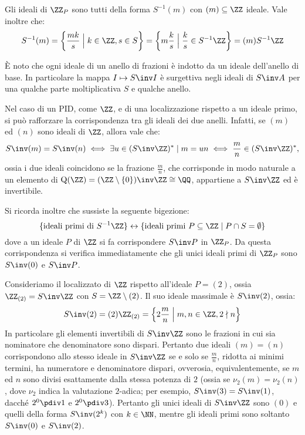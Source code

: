 \documentclass[11pt]{scrartcl}
\begin{document}
	Gli ideali di $\ZZ_P$
	sono tutti della forma $S^{-1}(m)$ con $(m)\subseteq \ZZ$ ideale. Vale inoltre
	che:
	\[
	S^{-1}(m) = \left\{\frac{mk}{s} \Bigm|k \in \ZZ, s \in S\right\} = 
	\left\{m\frac k s\Bigm| \frac k s \in S^{-1}\ZZ\right\} = (m)S^{-1}\ZZ
	\]
	
	È noto che ogni ideale di un anello di frazioni è indotto da un ideale
	dell'anello di base. In particolare la mappa $I \mapsto S\inv I$ è surgettiva
	negli ideali di $S\inv A$ per una qualche parte moltiplicativa $S$ e qualche
	anello. \medskip
	
	Nel
	caso di un PID, come $\ZZ$, e di una localizzazione rispetto a un ideale primo, si può rafforzare la corrispondenza tra gli ideali dei due anelli. Infatti, se $(m)$ ed $(n)$ sono ideali di $\ZZ$,
	allora vale che:
	\[ S\inv (m) = S\inv (n) \iff \exists u \in (S\inv \ZZ)^* \mid m = un \iff \frac{m}{n} \in (S\inv \ZZ)^*, \]
	ossia i due ideali coincidono se la frazione $\frac{m}{n}$, che corrisponde in modo naturale a un elemento di
	$\operatorname{Q}(\ZZ) = (\ZZ \setminus \{0\})\inv \ZZ \cong \QQ$, appartiene a $S\inv \ZZ$ ed è invertibile. \medskip
	
	Si ricorda inoltre che sussiste la seguente bigezione:
	\[
	\{\text{ideali primi di }S^{-1}\ZZ\} \leftrightarrow 
	\{\text{ideali primi } P\subseteq \ZZ \mid P \cap S = \emptyset\}
	\]
	dove a un ideale $P$ di $\ZZ$ si fa corrispondere $S\inv P$ in
	$\ZZ_P$. Da questa corrispondenza si verifica immediatamente che gli
	unici ideali primi di $\ZZ_P$ sono $S\inv (0)$ e $S\inv P$.
	
	\begin{remark}[Localizzazione rispetto a $P = (2)$]
		Consideriamo il localizzato di $\ZZ$ rispetto all'ideale $P = (2)$, ossia
		$\ZZ_{(2)} = S\inv \ZZ$ con $S = \ZZ \setminus (2)$. Il suo ideale massimale
		è $S\inv (2)$, ossia:
		\[ S\inv (2) = (2) \ZZ_{(2)} = \left\{ 2 \frac{m}{n} \Bigm| m, n \in \ZZ, 2 \nmid n \right\} \]
		In particolare gli elementi invertibili di $S\inv \ZZ$ sono le frazioni
		in cui sia nominatore che denominatore sono dispari. Pertanto due ideali
		$(m) = (n)$ corrispondono allo stesso ideale in $S\inv \ZZ$ se e solo
		se $\frac{m}{n}$, ridotta ai minimi termini, ha numeratore e denominatore
		dispari, ovverosia, equivalentemente, se $m$ ed $n$ sono divisi esattamente
		dalla stessa potenza di $2$ (ossia se $\nu_2(m) = \nu_2(n)$, dove
		$\nu_2$ indica la valutazione $2$-adica; per esempio, $S\inv (3) = S\inv (1)$, dacché $2^0 \pdiv 1$ e $2^0 \pdiv 3$).
		Pertanto gli unici ideali di $S\inv \ZZ$ sono $(0)$ e quelli della
		forma $S\inv (2^k)$ con $k \in \NN$, mentre gli ideali primi sono
		soltanto $S\inv (0)$ e $S\inv (2)$.
	\end{remark}
\end{document}
